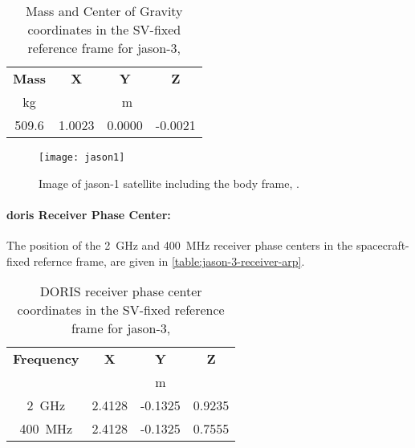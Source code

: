\begin{table}[h!]
    \centering
    \begin{tabular}{cccc}
        \toprule
        \textbf{Mass} & \textbf{X} & \textbf{Y} & \textbf{Z} \\
        \si{\kilo\gram} & \multicolumn{3}{c}{\si{\meter}} \\
        \hline
        509.6 & 1.0023 & 0.0000 & -0.0021 \\
       \bottomrule
    \end{tabular}
    \caption{Mass and Center of Gravity coordinates in the SV-fixed reference 
        frame for \gls{jason}-3, \cite{Cerri2022}}
    \label{table:jason-3-mass}
\end{table}

\begin{figure}
    \centering
    \texttt{[image: jason1]}
    \caption{Image of \gls{jason}-1 satellite including the body frame, \cite{Cerri2022}.}
    \label{fig:jason1}
\end{figure}

\paragraph{\gls{doris} Receiver Phase Center:}
The position of the \SI{2}{\giga\hertz} and \SI{400}{\mega\hertz} receiver phase 
centers in the spacecraft-fixed refernce frame, are given in \autoref{table:jason-3-receiver-arp}.
\begin{table}[h!]
    \centering
    \begin{tabular}{cccc}
        \toprule
        \textbf{Frequency} & \textbf{X} & \textbf{Y} & \textbf{Z} \\
         & \multicolumn{3}{c}{\si{\meter}} \\
        \hline
        \SI{2}{\giga\hertz} &   2.4128 & -0.1325 & 0.9235 \\
        \SI{400}{\mega\hertz} & 2.4128 & -0.1325 & 0.7555 \\
       \bottomrule
    \end{tabular}
    \caption{DORIS receiver phase center coordinates in the SV-fixed reference 
        frame for \gls{jason}-3, \cite{Cerri2022}}
    \label{table:jason-3-receiver-arp}
\end{table}

